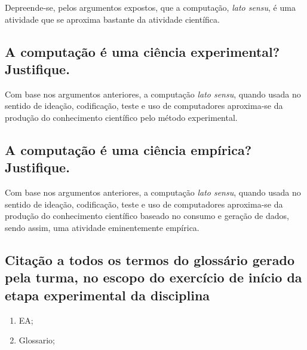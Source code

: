Depreende-se, pelos argumentos expostos, que a computação, \textit{lato sensu}, é uma atividade que se aproxima bastante da atividade científica.

\subsection{A computação é uma ciência experimental? Justifique. }

Com base nos argumentos anteriores, a computação \textit{lato sensu}, quando usada no sentido de ideação, codificação, teste e uso de computadores aproxima-se da produção do conhecimento científico pelo método experimental.

\subsection{A computação é uma ciência empírica? Justifique. }

Com base nos argumentos anteriores, a computação \textit{lato sensu}, quando usada no sentido de ideação, codificação, teste e uso de computadores aproxima-se da produção do conhecimento científico baseado no consumo e geração de dados, sendo assim, uma atividade eminentemente empírica.

\subsection{Citação a todos os termos do glossário gerado pela turma, no escopo do exercício de início da etapa experimental da disciplina}

\begin{enumerate}
\item \gls{EA};
\item \gls{Glossario};
\end{enumerate}


